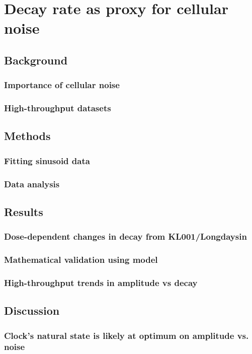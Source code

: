 \chapter{Decay rate as proxy for cellular noise}\label{chap:decay}
\section{Background}
\subsection{Importance of cellular noise}
\subsection{High-throughput datasets}
\section{Methods}
\subsection{Fitting sinusoid data}
\subsection{Data analysis}
\section{Results}
\subsection{Dose-dependent changes in decay from KL001/Longdaysin}
\subsection{Mathematical validation using model}
\subsection{High-throughput trends in amplitude vs decay}
\section{Discussion}
\subsection{Clock's natural state is likely at optimum on amplitude vs. noise}
